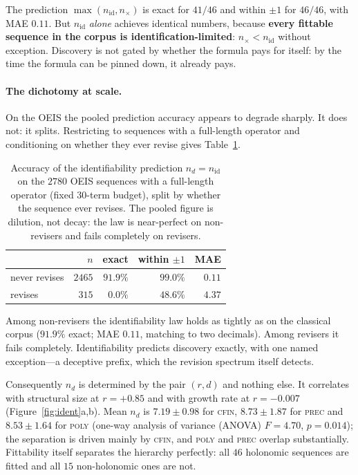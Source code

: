 \documentclass[10pt]{article}
\theoremstyle{definition}
\theoremstyle{plain}
\newcommand{\nid}{n_{\mathrm{id}}}
\newcommand{\nx}{n_{\times}}
\newcommand{\nd}{n_{d}}
\begin{document}
The prediction $\max(\nid,\nx)$ is exact for $41/46$ and within $\pm1$ for
$46/46$, with MAE $0.11$. But $\nid$ \emph{alone} achieves identical numbers,
because \textbf{every fittable sequence in the corpus is
identification-limited}: $\nx < \nid$ without exception. Discovery is not
gated by whether the formula pays for itself: by the time the formula can be
pinned down, it already pays.

\paragraph{The dichotomy at scale.} On the OEIS the pooled prediction accuracy
appears to degrade sharply. It does not: it splits. Restricting to sequences
with a full-length operator and conditioning on whether they ever revise gives
Table~\ref{tab:dichotomy}.

\begin{table}[h]
\centering
\small
\begin{tabular}{lrrrr}
\toprule
& $n$ & exact & within $\pm1$ & MAE \\
\midrule
never revises & $2465$ & $91.9\%$ & $99.0\%$ & $0.11$ \\
revises       & $315$  & $0.0\%$  & $48.6\%$ & $4.37$ \\
\bottomrule
\end{tabular}
\caption{Accuracy of the identifiability prediction $\nd=\nid$ on the $2780$
OEIS sequences with a full-length operator (fixed $30$-term budget), split by
whether the sequence ever revises. The pooled figure is dilution, not decay:
the law is near-perfect on non-revisers and fails completely on revisers.}
\label{tab:dichotomy}
\end{table}

Among non-revisers the identifiability law holds as tightly as on the classical
corpus ($91.9\%$ exact; MAE $0.11$, matching to two decimals). Among revisers
it fails completely. Identifiability predicts discovery exactly, with one named
exception---a deceptive prefix, which the revision spectrum itself detects.

Consequently $\nd$ is determined by the pair $(r,d)$ and nothing else. It
correlates with structural size at $r = +0.85$ and with growth rate at
$r = -0.007$ (Figure~\ref{fig:ident}a,b). Mean $\nd$ is $7.19 \pm 0.98$ for
\textsc{cfin}, $8.73 \pm 1.87$ for \textsc{prec} and $8.53 \pm 1.64$ for
\textsc{poly} (one-way analysis of variance (ANOVA) $F = 4.70$, $p = 0.014$); the
separation is
driven mainly by \textsc{cfin}, and \textsc{poly} and \textsc{prec} overlap
substantially. Fittability itself separates the hierarchy perfectly: all $46$
holonomic sequences are fitted and all $15$ non-holonomic ones are not.
\end{document}
